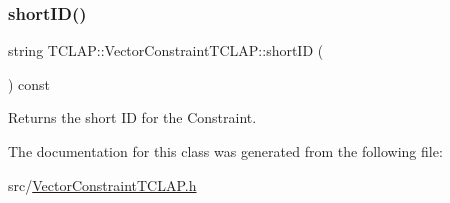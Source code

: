 \subsubsection{\texorpdfstring{short\+I\+D()}{shortID()}}
{\footnotesize\ttfamily string T\+C\+L\+A\+P\+::\+Vector\+Constraint\+T\+C\+L\+A\+P\+::short\+ID (\begin{DoxyParamCaption}{ }\end{DoxyParamCaption}) const}



Returns the short ID for the Constraint. 



The documentation for this class was generated from the following file\+:\begin{DoxyCompactItemize}
\item 
src/\hyperlink{_vector_constraint_t_c_l_a_p_8h}{Vector\+Constraint\+T\+C\+L\+A\+P.\+h}\end{DoxyCompactItemize}
